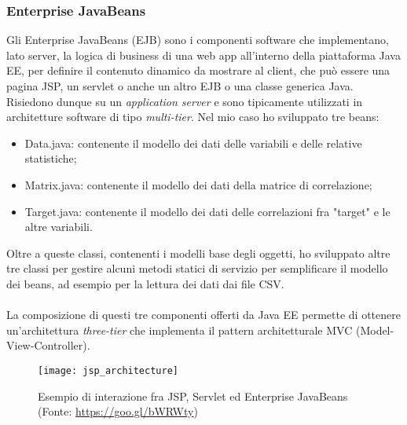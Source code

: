 \subsubsection{Enterprise JavaBeans}
Gli Enterprise JavaBeans (EJB) sono i componenti software che implementano, lato server, la logica di business di una \gls{web app} all'interno della piattaforma Java EE, per definire il contenuto dinamico da mostrare al client, che può essere una pagina JSP, un servlet o anche un altro EJB o una classe generica Java. Risiedono dunque su un \textit{application server} e sono tipicamente utilizzati in architetture software di tipo \textit{multi-tier}.
Nel mio caso ho sviluppato tre beans:
\begin{itemize}
	\item Data.java: contenente il modello dei dati delle variabili e delle relative statistiche;
	\item Matrix.java: contenente il modello dei dati della matrice di correlazione;
	\item Target.java: contenente il modello dei dati delle correlazioni fra "target" e le altre variabili.
\end{itemize}

Oltre a queste classi, contenenti i modelli base degli oggetti, ho sviluppato altre tre classi per gestire alcuni metodi statici di servizio per semplificare il modello dei beans, ad esempio per la lettura dei dati dai file \gls{CSV}.\\\\
La composizione di questi tre componenti offerti da Java EE permette di ottenere un'architettura \textit{three-tier} che implementa il pattern architetturale MVC (Model-View-Controller).
\begin{figure}[!h]
	\centering
	\texttt{[image: jsp\_architecture]}
	\caption{Esempio di interazione fra JSP, Servlet ed Enterprise JavaBeans (Fonte: \href{https://goo.gl/bWRWty}{https://goo.gl/bWRWty})}
\end{figure}

